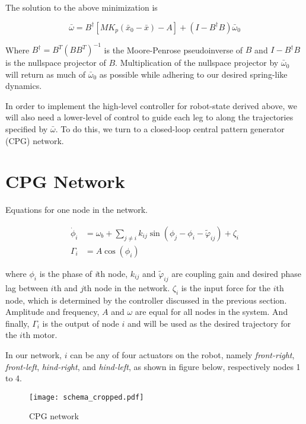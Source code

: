 \documentclass{article}
\begin{document}
The solution to the above minimization is

\begin{equation}
	\bar{\omega} = B^\dagger [M K_p (\bar{x}_0 - \bar{x}) - A] + (I - B^\dagger B) \bar{\omega}_0
	\label{eq:controller}
\end{equation}

Where $B^\dagger = B^T (B B^T)^{-1}$ is the Moore-Penrose pseudoinverse of $B$ and $I - B^\dagger B$ is the nullspace projector of $B$. Multiplication of the nullspace projector by $\bar{\omega}_0$ will return as much of $\bar{\omega}_0$ as possible while adhering to our desired spring-like dynamics.

In order to implement the high-level controller for robot-state derived above, we will also need a lower-level of control to guide each leg to along the trajectories specified by $\bar{\omega}$. To do this, we turn to a closed-loop central pattern generator (CPG) network.

\section*{CPG Network}

Equations for one node in the network.

\begin{align}\label{eq:one_node}
	\dot \phi_i &= \omega_{b} + \sum_{j \neq i} k_{ij} \sin \left( \phi_j - \phi_i - \tilde{\varphi}_{ij} \right ) + \zeta_i\\
	\Gamma_i    &= A \cos(\phi_i)
\end{align}

where $\phi_i$ is the phase of \textit{i}th node, $k_{ij}$ and $\tilde{\varphi}_{ij}$ are coupling gain and desired phase lag between $i$th and $j$th node in the network. $\zeta_i$ is the input force for the $i$th node, which is determined by the controller discussed in the previous section. Amplitude and frequency, $A$ and $\omega$ are equal for all nodes in the system. And finally, $\Gamma_i$ is the output of node $i$ and will be used as the desired trajectory for the $i$th motor.

In our network, $i$ can be any of four actuators on the robot, namely \textit{front-right}, \textit{front-left}, \textit{hind-right}, and  \textit{hind-left}, as shown in figure below, respectively nodes 1 to 4.

\begin{figure}[thpb]
	\centering
		\centering
		\texttt{[image: schema\_cropped.pdf]}
		\centering
		\caption{CPG network}
		\label{fig:CPG_Network}
\end{figure}
\end{document}
